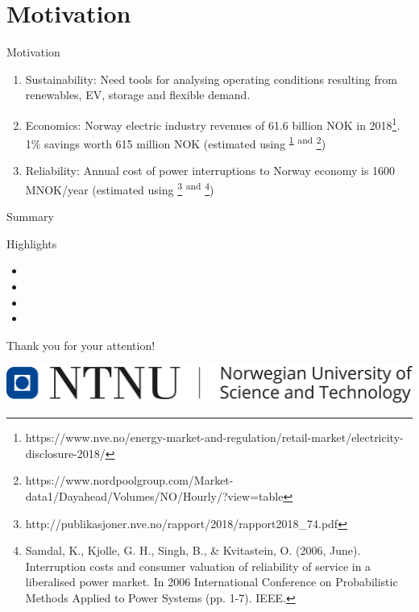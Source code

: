 \documentclass{beamer}
\begin{document}
\section{Motivation}	
\begin{frame}{Motivation}
		\begin{enumerate}
  			\item<1-> \vskip -1cm Sustainability: {\footnotesize Need tools for analysing operating conditions resulting from renewables, EV, storage and flexible demand.}
			\item<2-> Economics: {\footnotesize Norway electric industry revenues of 61.6 billion NOK in 2018\footnote{\label{note1} \tiny https://www.nve.no/energy-market-and-regulation/retail-market/electricity-disclosure-2018/}. 1\% savings worth 615 million NOK (estimated using \textsuperscript{\ref{note1}} \textsuperscript{and} \footnote{\tiny{https://www.nordpoolgroup.com/Market-data1/Dayahead/Volumes/NO/Hourly/?view=table}})} 

			\item<3-> Reliability: {\footnotesize Annual cost of power interruptions to Norway economy is 1600 MNOK/year (estimated using \footnote{\tiny http://publikasjoner.nve.no/rapport/2018/rapport2018\_74.pdf} \textsuperscript{and} \footnote{\tiny Samdal, K., Kjolle, G. H., Singh, B., \& Kvitastein, O. (2006, June). Interruption costs and consumer valuation of reliability of service in a liberalised power market. In 2006 International Conference on Probabilistic Methods Applied to Power Systems (pp. 1-7). IEEE.})   }
	\end{enumerate}
		\end{frame}	
\begin{frame}{Summary}
\begin{block}{Highlights}
{\scriptsize
\begin{itemize}
\item<1-> 
\item<2-> 
\item<3-> 
\item<4-> 
\end{itemize}
}
\end{block}
\end{frame}


\begin{frame}
\centering
Thank you for your attention!\\
		\vskip 0.8cm

\centering
\includegraphics[scale=0.2]{ntnulogo_eng.png}
\end{frame} 
\end{document}

